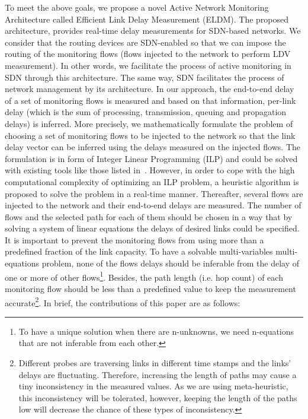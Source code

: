 \documentclass[10pt, journal, letterpaper]{IEEEtran}
\begin{document}
To meet the above goals, we propose a novel Active Network Monitoring Architecture called Efficient Link Delay Measurement (ELDM). The proposed architecture, provides real-time delay measurements for SDN-based networks. We consider that the routing devices are SDN-enabled so that we can impose the routing of the monitoring flows (flows injected to the network to perform LDV measurement). In other words, we facilitate the process of active monitoring in SDN through this architecture. The same way, SDN facilitates the process of network management by its architecture. In our approach, the end-to-end delay of a set of monitoring flows is measured and based on that information, per-link delay (which is the sum of processing, transmission, queuing and propagation delays) is inferred. More precisely, we mathematically formulate the problem of choosing a set of monitoring flows to be injected to the network so that the link delay vector can be inferred using the delays measured on the injected flows. The formulation is in form of Integer Linear Programming (ILP) and could be solved with existing tools like those listed in~\cite{wikipedia_2020_listOptimization_software}. However, in order to cope with the high computational complexity of optimizing an ILP problem, a heuristic algorithm is proposed to solve the problem in a real-time manner. Thereafter, several flows are injected to the network and their end-to-end delays are measured. The number of flows and the selected path for each of them should be chosen in a way that by solving a system of linear equations the delays of desired links could be specified. It is important to prevent the monitoring flows from using more than a predefined fraction of the link capacity. To have a solvable multi-variables multi-equations problem, none of the flows delays should be inferable from the delay of one or more of other flows\footnote{To have a unique solution when there are n-unknowns, we need n-equations that are not inferable from each other.}. Besides, the path length (i.e. hop count) of each monitoring flow should be less than a predefined value to keep the measurement accurate\footnote{Different probes are traversing links in different time stamps and the links' delays are fluctuating. Therefore, increasing the length of paths may cause a tiny inconsistency in the measured values. As we are using meta-heuristic, this inconsistency will be tolerated, however, keeping the length of the paths low will decrease the chance of these types of inconsistency.}.
In brief, the contributions of this paper are as follows:
\end{document}
